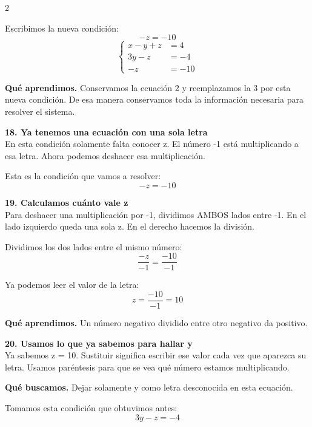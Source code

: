 \documentclass[11pt,a4paper,landscape]{article}
\begin{document}
\begin{multicols*}{2}
\begin{minipage}{\linewidth}
\par\smallskip Escribimos la nueva condición:
\[-z = -10\]
\[\left\{\begin{aligned}x - y + z &= 4\\3y - z &= -4\\-z &= -10\end{aligned}\right.\]
\par\smallskip\textbf{Qué aprendimos.} Conservamos la ecuación 2 y reemplazamos la 3 por esta nueva condición. De esa manera conservamos toda la información necesaria para resolver el sistema.
\end{minipage}\par\medskip
\noindent\begin{minipage}{\linewidth}\textbf{18. Ya tenemos una ecuación con una sola letra}\\[2pt]En esta condición solamente falta conocer z. El número -1 está multiplicando a esa letra. Ahora podemos deshacer esa multiplicación.
\par\smallskip Esta es la condición que vamos a resolver:
\[-z = -10\]
\end{minipage}\par\medskip
\noindent\begin{minipage}{\linewidth}\textbf{19. Calculamos cuánto vale z}\\[2pt]Para deshacer una multiplicación por -1, dividimos AMBOS lados entre -1. En el lado izquierdo queda una sola z. En el derecho hacemos la división.
\par\smallskip Dividimos los dos lados entre el mismo número:
\[\frac{-z}{-1}=\frac{-10}{-1}\]
\par\smallskip Ya podemos leer el valor de la letra:
\[z=\frac{-10}{-1}=10\]
\par\smallskip\textbf{Qué aprendimos.} Un número negativo dividido entre otro negativo da positivo.
\end{minipage}\par\medskip
\noindent\begin{minipage}{\linewidth}\textbf{20. Usamos lo que ya sabemos para hallar y}\\[2pt]Ya sabemos z = 10. Sustituir significa escribir ese valor cada vez que aparezca su letra. Usamos paréntesis para que se vea qué número estamos multiplicando.
\par\smallskip\textbf{Qué buscamos.} Dejar solamente y como letra desconocida en esta ecuación.
\par\smallskip Tomamos esta condición que obtuvimos antes:
\[3y - z = -4\]

\end{minipage}
\end{multicols*}
\end{document}
